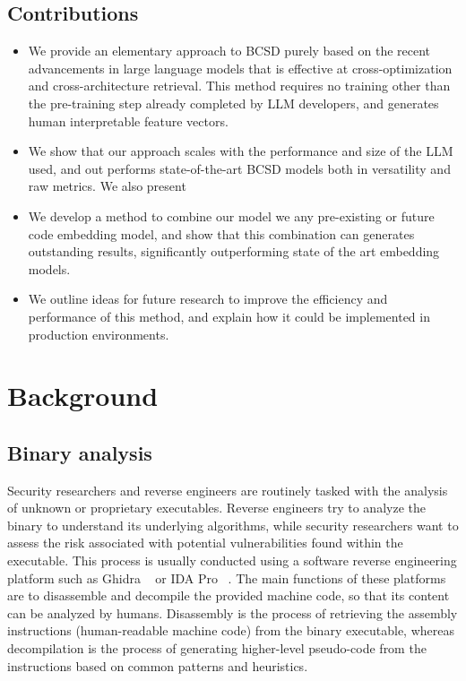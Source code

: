 \subsection{Contributions}

\begin{itemize}
\item We provide an elementary approach to BCSD purely based on the recent advancements in large language models that
    is effective at cross-optimization and cross-architecture retrieval. This method requires no training other than
    the pre-training step already completed by LLM developers, and generates human interpretable feature vectors.
\item We show that our approach scales with the performance and size of the LLM used, and out performs state-of-the-art BCSD models
    both in versatility and raw metrics. We also present 
\item We develop a method to combine our model we any pre-existing or future code embedding model, and show that this combination can
    generates outstanding results, significantly outperforming state of the art embedding models.
\item We outline ideas for future research to improve the efficiency and performance of this method, and explain how it
    could be implemented in production environments.
\end{itemize}

\section{Background}

\subsection{Binary analysis}

Security researchers and reverse engineers are routinely tasked with the analysis of unknown or proprietary executables.
Reverse engineers try to analyze the binary to understand its underlying algorithms, while security researchers want to assess
the risk associated with potential vulnerabilities found within the executable. This process is usually conducted using
a software reverse engineering platform such as Ghidra ~\cite{ghidra} or IDA Pro ~\cite{ida}. The main functions of these platforms are to
disassemble and decompile the provided machine code, so that its content can be analyzed by humans. Disassembly is
the process of retrieving the assembly instructions (human-readable machine code) from the binary executable, whereas decompilation
is the process of generating higher-level pseudo-code from the instructions based on common patterns and heuristics.

